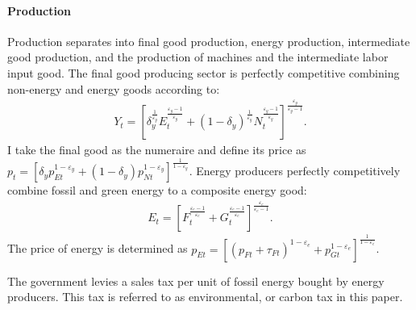 
\paragraph{Production}
Production separates into final good production, energy production, intermediate good production, and the production of machines and the intermediate labor input good. 
The final good producing sector is perfectly competitive combining  non-energy and energy goods according to:
\begin{align*}
Y_t=\left[\delta_y^\frac{1}{\varepsilon_y}E_{t}^{\frac{\varepsilon_y-1}{\varepsilon_y}}+(1-\delta_y)^\frac{1}{\varepsilon_y}N_{t}^{\frac{\varepsilon_y-1}{\varepsilon_y}}\right]^\frac{\varepsilon_y}{\varepsilon_y-1}.
\end{align*} 
I take the final good as the numeraire and define its price as $p_t=\left[\delta_yp_{Et}^{1-\varepsilon_y}+(1-\delta_y)p_{Nt}^{1-\varepsilon_y}\right]^{\frac{1}{1-\varepsilon_y}}$.
Energy producers perfectly competitively combine fossil and green energy to a composite energy good:
\begin{align*}
E_t=\left[F_t^\frac{\varepsilon_e-1}{\varepsilon_e}+G_t^\frac{\varepsilon_e-1}{\varepsilon_e}\right]^\frac{\varepsilon_e}{\varepsilon_e-1}.
\end{align*}
The price of energy is determined as  $p_{Et}= \left[(p_{Ft}+\tau_{Ft})^{1-\varepsilon_e}+p_{Gt}^{1-\varepsilon_e}\right]^\frac{1}{{1-\varepsilon_e}}$.



The government levies a sales tax per unit of fossil energy bought by energy producers. This tax is referred to as environmental, or carbon tax in this paper. 

